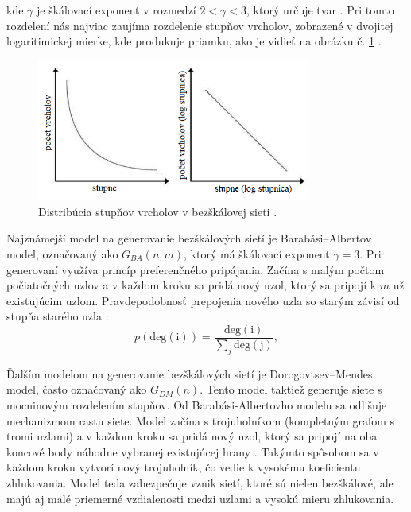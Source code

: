 kde $\gamma$ je škálovací exponent v rozmedzí $2 < \gamma < 3$, ktorý určuje tvar \cite{barabasi2016network} . Pri tomto rozdelení nás najviac zaujíma
rozdelenie stupňov vrcholov, zobrazené v dvojitej logaritimickej mierke, kde produkuje priamku, ako je vidieť na obrázku č. \ref{obr:powerlaw} .

\begin{figure}
    \centerline{\includegraphics[width=0.8\textwidth]{images/powerlaw.png}}
    \caption[Distribúcia stupňov vrcholov v bezškálovej sieti.]{Distribúcia stupňov vrcholov v bezškálovej sieti \cite{inproceedings} .}
    \label{obr:powerlaw}
\end{figure}

Najznámejší model na generovanie bezškálových sietí je Barabási–Albertov model, označovaný ako $G_{BA}(n, m)$, ktorý má
škálovací exponent $\gamma = 3$. Pri generovaní využíva princíp preferenčného pripájania. Začína s malým počtom počiatočných uzlov a v každom kroku sa pridá nový uzol,
ktorý sa pripojí k $m$ už existujúcim uzlom. Pravdepodobnosť prepojenia nového uzla so starým závisí od stupňa starého uzla \cite{barabasi2016network} :
\begin{equation}
    p(\mathrm{deg(i)}) = \frac{\mathrm{deg(i)}}{\sum_j \mathrm{deg(j)}},
    \label{eq:preferential_attachment}
\end{equation}

Ďalším modelom na generovanie bezškálových sietí je Dorogovtsev–Mendes model, často označovaný ako $G_{DM}(n)$.
Tento model taktiež generuje siete s mocninovým rozdelením stupňov. Od Barabási-Albertovho modelu sa odlišuje mechanizmom rastu siete.
Model začína s trojuholníkom (kompletným grafom s tromi uzlami) a v každom kroku sa pridá nový uzol, ktorý sa pripojí na oba koncové body
náhodne vybranej existujúcej hrany \cite{dorogovtsev2002evolution}. Takýmto spôsobom sa v každom kroku vytvorí nový trojuholník, čo vedie k
vysokému koeficientu zhlukovania. Model teda zabezpečuje vznik sietí, ktoré sú nielen bezškálové, ale majú aj malé
priemerné vzdialenosti medzi uzlami a vysokú mieru zhlukovania.

